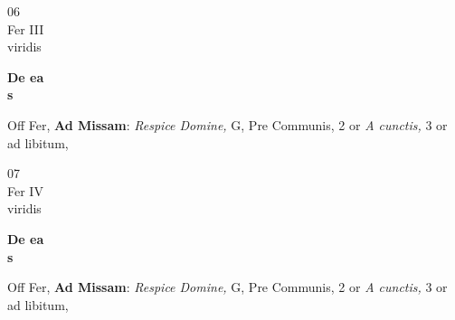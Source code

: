 \documentclass[10pt, openany]{book}
\begin{document}
        \begin{center}
            \begin{minipage}{3.5in}
                \vspace{2em}
                \begin{minipage}{0.5in}
                    {\Huge 06} \\
                    {\normalsize Fer III} \\
                    {\normalsize viridis}
                \end{minipage}
                \begin{minipage}{3.0in}
                    \textbf{ \large De ea \\
                    \textnormal{\normalsize s}} \\ 
                \end{minipage}
                \begin{justify}Off Fer, \textbf{Ad Missam}: \textit{Respice Domine,} G, Pre Communis, 2 or \textit{A cunctis,} 3 or ad libitum,   
                \end{justify}
            \end{minipage}
        \end{center}
    
        \begin{center}
            \begin{minipage}{3.5in}
                \vspace{2em}
                \begin{minipage}{0.5in}
                    {\Huge 07} \\
                    {\normalsize Fer IV} \\
                    {\normalsize viridis}
                \end{minipage}
                \begin{minipage}{3.0in}
                    \textbf{ \large De ea \\
                    \textnormal{\normalsize s}} \\ 
                \end{minipage}
                \begin{justify}Off Fer, \textbf{Ad Missam}: \textit{Respice Domine,} G, Pre Communis, 2 or \textit{A cunctis,} 3 or ad libitum,   
                \end{justify}
            \end{minipage}
        \end{center}
    
\end{document}
